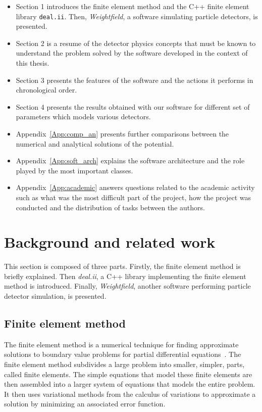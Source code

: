 \documentclass[11pt]{article}
\begin{document}
		\begin{itemize}
			\item Section 1 introduces the finite element method and the
			C++ finite element library \texttt{deal.ii}. Then, \textit{Weightfield},
			a software simulating particle detectors, is presented.
			\item Section 2 is a resume of the detector physics concepts that must be
			known to understand the problem solved by the software developed in the
			context of this thesis.
			\item Section 3 presents the features of the software and the actions
			it performs in chronological order.

			\item Section 4 presents the results obtained with our software for
			different set of parameters which models various detectors.

			\item Appendix~\ref{App:comp_an} presents further comparisons between
			the numerical and analytical solutions of the potential.

			\item Appendix~\ref{App:soft_arch} explains the software architecture and the role played by
			the most important classes.

			\item Appendix~\ref{App:academic} answers questions related to the
			academic activity such as what was
			the most difficult part of the project, how the project was conducted
			and the distribution of tasks between the authors.

		\end{itemize}

\newpage
\section{Background and related work}

	This section is composed of three parts. Firstly,
	the finite element method is briefly explained. Then \textit{deal.ii},
	a C++ library implementing the finite element method is introduced. Finally,
	\textit{Weightfield}, another software performing particle detector simulation,
	is presented.

	\subsection{Finite element method}

		The finite element method is a numerical technique for
		finding approximate solutions to boundary value problems for partial
		differential equations~\cite{wiki_fem}. The finite element method subdivides a large
		problem into smaller, simpler, parts, called finite elements. The
		simple equations that model these finite elements are then assembled
		into a larger system of equations that models the entire problem. It
		then uses variational methods from the calculus of variations to
		approximate a solution by minimizing an associated error function.
\end{document}
